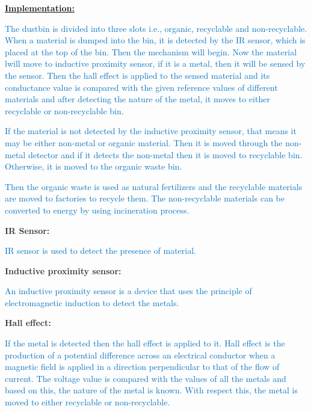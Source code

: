 \documentclass[12pt]{article}
\begin{document}
\vspace{\baselineskip}
{\fontsize{14pt}{16.8pt}\selectfont \textbf{\uline{Implementation:}}\par}\par

\textcolor[HTML]{0070C0}{The dustbin is divided into three slots i.e., organic, recyclable and non-recyclable. When a material is dumped into the bin, it is detected by the IR sensor, which is placed at the top of the bin. Then the mechanism will begin. Now the material lwill move to inductive proximity sensor, if it is a metal, then it will be sensed by the sensor. Then the hall effect is applied to the sensed material and its conductance value is compared with the given reference values of different materials and after detecting the nature of the metal, it moves to either recyclable or non-recyclable bin. }\par

\textcolor[HTML]{0070C0}{If the material is not detected by the inductive proximity sensor, that means it may be either non-metal or organic material. Then it is moved through the non-metal detector and if it detects the non-metal then it is moved to recyclable bin. Otherwise, it is moved to the organic waste bin. }\par

{\fontsize{10pt}{12.0pt}\selectfont \textcolor[HTML]{0070C0}{Then the organic waste is used as natural fertilizers and the recyclable materials are moved to factories to recycle them. The non-recyclable materials can be converted to energy by using incineration process. }\par}\par

\textbf{\textcolor[HTML]{36363D}{IR Sensor:}}\par

\textcolor[HTML]{0070C0}{IR sensor is used to detect the presence of material. }\par

\textbf{\textcolor[HTML]{36363D}{Inductive proximity sensor:}}\par

\textcolor[HTML]{0070C0}{An inductive proximity sensor is a device that uses the principle of electromagnetic induction to detect the metals. }\par

\textbf{\textcolor[HTML]{36363D}{Hall effect:}}\par

\textcolor[HTML]{0070C0}{If the metal is detected then the hall effect is applied to it. Hall effect is the production of a potential difference across an electrical conductor when a magnetic field is applied in a direction perpendicular to that of the flow of current. The voltage value is compared with the values of all the metals and based on this, the nature of the metal is known. With respect this, the metal is moved to either recyclable or non-recyclable. }\par
\end{document}
